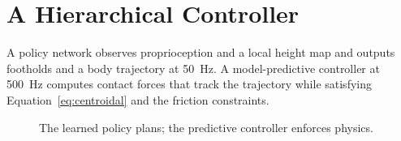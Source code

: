 \chapter{A Hierarchical Controller}
\label{ch:method}

A policy network observes proprioception and a local height map and outputs footholds and a
body trajectory at 50~Hz. A model-predictive controller at 500~Hz computes contact forces that
track the trajectory while satisfying Equation~\eqref{eq:centroidal} and the friction
constraints.

\begin{figure}[htbp]
  \centering
  \caption{The learned policy plans; the predictive controller enforces physics.}
  \label{fig:hier}
\end{figure}
